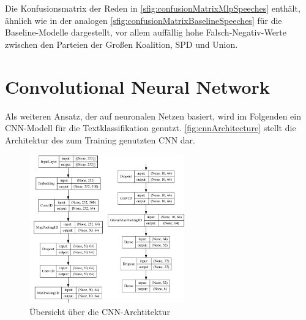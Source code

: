 Die Konfusionsmatrix der Reden in \autoref{sfig:confusionMatrixMlpSpeeches} enthält, ähnlich wie in der analogen \autoref{sfig:confusionMatrixBaselineSpeeches} für die Baseline-Modelle dargestellt, vor allem auffällig hohe Falsch-Negativ-Werte zwischen den Parteien der Großen Koalition, \ac{SPD} und Union.

\section{Convolutional Neural Network}

Als weiteren Ansatz, der auf neuronalen Netzen basiert, wird im Folgenden ein \ac{CNN}-Modell für die Textklassifikation genutzt. \autoref{fig:cnnArchitecture} stellt die Architektur des zum Training genutzten \ac{CNN} dar.

\begin{figure}[H]
  \centering
  \includegraphics[width=0.6\textwidth]{data/images/cnn.png}
  \caption{Übersicht über die \acs{CNN}-Archtitektur} \label{fig:cnnArchitecture}
\end{figure}


